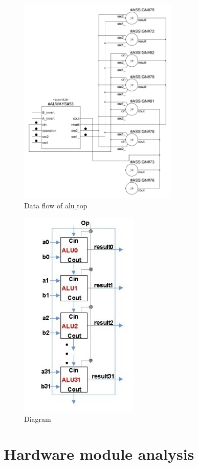 \documentclass[12pt,a4paper]{article}
\theoremstyle{definition}
\begin{document}
\begin{figure}[H]
\centering
\includegraphics[height=10cm]{fig/alu_top.png}
\caption{Data flow of alu$\_$top}
\label{fig:alu_top}
\end{figure}

\begin{figure}[H]
\centering
\includegraphics[height=10cm]{fig/diagram.jpg}
\caption{Diagram}
\label{fig:diagram}
\end{figure}

\section{Hardware module analysis}
\end{document}
